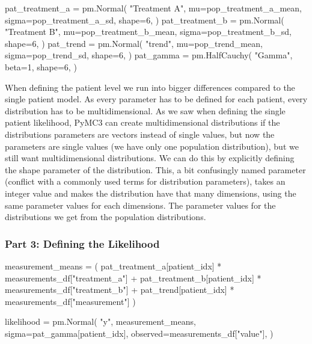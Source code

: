 \documentclass[12pt,a4paper,leqno]{report}
\theoremstyle{plain}
\theoremstyle{definition}
\theoremstyle{remark}
\begin{document}
\bigskip
\begin{pyverbatim}[][fontsize=\footnotesize]
    pat_treatment_a = pm.Normal(
        "Treatment A",
        mu=pop_treatment_a_mean,
        sigma=pop_treatment_a_sd,
        shape=6,
    )
    pat_treatment_b = pm.Normal(
        "Treatment B",
        mu=pop_treatment_b_mean,
        sigma=pop_treatment_b_sd,
        shape=6,
    )
    pat_trend = pm.Normal(
        "trend",
        mu=pop_trend_mean,
        sigma=pop_trend_sd,
        shape=6,
    )
    pat_gamma = pm.HalfCauchy(
        "Gamma", beta=1, shape=6,
    )
\end{pyverbatim}
\bigskip

When defining the patient level we run into bigger differences compared to the single
patient model. As every parameter has to be defined for each patient, every distribution
has to be multidimensional. As we saw when defining the single patient likelihood, PyMC3
can create multidimensional distributions if the distributions parameters are vectors
instead of single values, but now the parameters are single values (we have only one
population distribution), but we still want multidimensional distributions. We can do
this by explicitly defining the shape parameter of the distribution. This, a bit
confusingly named parameter (conflict with a commonly used terms for distribution
parameters), takes an integer value and makes the distribution have that many
dimensions, using the same parameter values for each dimensions. The parameter values
for the distributions we get from the population distributions.

\subsubsection*{Part 3: Defining the Likelihood}
\bigskip
\begin{pyverbatim}[][fontsize=\footnotesize]
    measurement_means = (
        pat_treatment_a[patient_idx] * measurements_df["treatment_a"]
        + pat_treatment_b[patient_idx] * measurements_df["treatment_b"]
        + pat_trend[patient_idx] * measurements_df["measurement"]
    )

    likelihood = pm.Normal(
        "y",
        measurement_means,
        sigma=pat_gamma[patient_idx],
        observed=measurements_df["value"],
    )
\end{pyverbatim}
\bigskip

\end{document}
